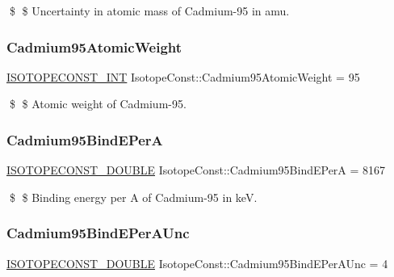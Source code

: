 \$ \$ Uncertainty in atomic mass of Cadmium-\/95 in amu. \mbox{\label{group___isotope_const-_cadmium-_cd95_gacc6c3d015ae2664890709d634a5e9762}} 
\subsubsection{\texorpdfstring{Cadmium95\+Atomic\+Weight}{Cadmium95AtomicWeight}}
{\footnotesize\ttfamily \mbox{\hyperlink{group___isotope_const-_macros_ga5f18360b3e99483a35c32d789e62621c}{I\+S\+O\+T\+O\+P\+E\+C\+O\+N\+S\+T\+\_\+\+I\+NT}} Isotope\+Const\+::\+Cadmium95\+Atomic\+Weight = 95}

\$ \$ Atomic weight of Cadmium-\/95. \mbox{\label{group___isotope_const-_cadmium-_cd95_gad5c65971b4345de266a01b3f4d470b8b}} 
\subsubsection{\texorpdfstring{Cadmium95\+Bind\+E\+PerA}{Cadmium95BindEPerA}}
{\footnotesize\ttfamily \mbox{\hyperlink{group___isotope_const-_macros_ga8f45a7272ce02c0b4c65c44636ed719a}{I\+S\+O\+T\+O\+P\+E\+C\+O\+N\+S\+T\+\_\+\+D\+O\+U\+B\+LE}} Isotope\+Const\+::\+Cadmium95\+Bind\+E\+PerA = 8167}

\$ \$ Binding energy per A of Cadmium-\/95 in keV. \mbox{\label{group___isotope_const-_cadmium-_cd95_ga51605aea8c5dd73638a9cb4daf0cf198}} 
\subsubsection{\texorpdfstring{Cadmium95\+Bind\+E\+Per\+A\+Unc}{Cadmium95BindEPerAUnc}}
{\footnotesize\ttfamily \mbox{\hyperlink{group___isotope_const-_macros_ga8f45a7272ce02c0b4c65c44636ed719a}{I\+S\+O\+T\+O\+P\+E\+C\+O\+N\+S\+T\+\_\+\+D\+O\+U\+B\+LE}} Isotope\+Const\+::\+Cadmium95\+Bind\+E\+Per\+A\+Unc = 4}

